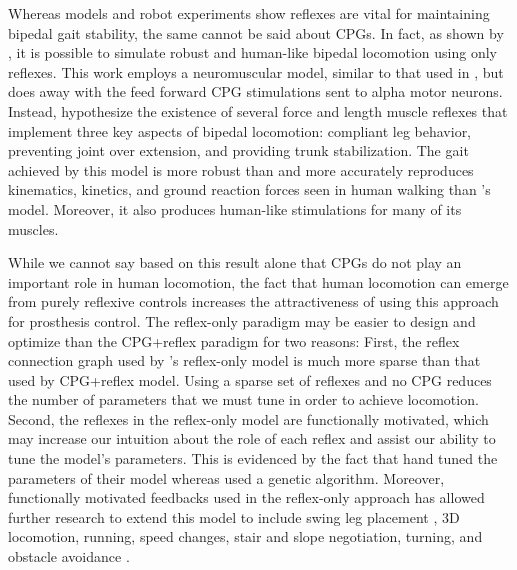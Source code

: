 Whereas models and robot experiments show reflexes are vital for maintaining
bipedal gait stability, the same cannot be said about CPGs. In fact, as shown by
\citet{geyer2010muscle}, it is possible to simulate robust and human-like
bipedal locomotion using only reflexes. This work employs a neuromuscular
model, similar to that used in \citet{ogihara2001generation}, but does away with
the feed forward CPG stimulations sent to alpha motor neurons. Instead,
\citeauthor{geyer2010muscle} hypothesize the existence of several force and
length muscle reflexes that implement three key aspects of bipedal locomotion:
compliant leg behavior, preventing joint over extension, and providing trunk
stabilization. The gait achieved by this model is more robust than and more
accurately reproduces kinematics, kinetics, and ground reaction forces seen in
human walking than \citeauthor{ogihara2001generation}'s model. Moreover, it also
produces human-like stimulations for many of its muscles.

While we cannot say based on this result alone that CPGs do not play an
important role in human locomotion, the fact that human locomotion can emerge
from purely reflexive controls increases the attractiveness of using this
approach for prosthesis control. The reflex-only paradigm may be easier to
design and optimize than the CPG+reflex paradigm for two reasons: First, the
reflex connection graph used by \citet{geyer2010muscle}'s reflex-only model is
much more sparse than that used by \citet{ogihara2001generation} CPG+reflex
model. Using a sparse set of reflexes and no CPG reduces the number of
parameters that we must tune in order to achieve locomotion. Second, the
reflexes in the reflex-only model are functionally motivated, which may increase
our intuition about the role of each reflex and assist our ability to tune the
model's parameters. This is evidenced by the fact that
\citeauthor{geyer2010muscle} hand tuned the parameters of their model whereas
\citeauthor{ogihara2001generation} used a genetic algorithm.  Moreover,
functionally motivated feedbacks used in the reflex-only approach has allowed
further research to extend this model to include swing leg placement
\citep{desai2013muscle}, 3D locomotion, running, speed changes, stair and slope
negotiation, turning, and obstacle avoidance \citep{song2015neural}.  

